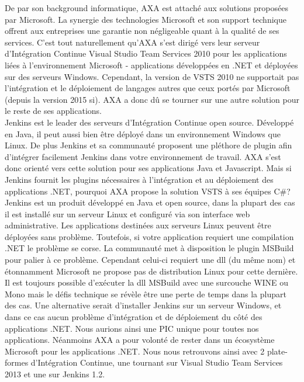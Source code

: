     De par son background informatique, AXA est attaché aux solutions proposées par Microsoft. La synergie des technologies Microsoft et son support technique offrent aux entreprises une garantie non négligeable quant à la qualité de ses services. C'est tout naturellement qu'AXA s'est dirigé vers leur serveur d'Intégration Continue Visual Studio Team Services 2010 pour les applications liées à l'environnement Microsoft - applications développées en .NET et déployées sur des serveurs Windows. Cependant, la version de VSTS 2010 ne supportait pas l'intégration et le déploiement de langages autres que ceux portés par Microsoft (depuis la version 2015 si). AXA a donc dû se tourner sur une autre solution pour le reste de ses applications.\\

    Jenkins est le leader des serveurs d'Intégration Continue open source. Développé en Java, il peut aussi bien être déployé dans un environnement Windows que Linux. De plus Jenkins et sa communauté proposent une pléthore de plugin afin d'intégrer facilement Jenkins dans votre environnement de travail. AXA s'est donc orienté vers cette solution pour ses applications Java et Javascript. Mais si Jenkins fournit les plugins nécessaires à l'intégration et au déploiement des applications .NET, pourquoi AXA propose la solution VSTS à ses équipes C\#?\\

    Jenkins est un produit développé en Java et open source, dans la plupart des cas il est installé sur un serveur Linux et configuré via son interface web administrative. Les applications destinées aux serveurs Linux peuvent être déployées sans problème. Toutefois, si votre application requiert une compilation .NET le problème se corse. La communauté met à disposition le plugin MSBuild pour palier à ce problème. Cependant celui-ci requiert une dll (du même nom) et étonnamment Microsoft ne propose pas de distribution Linux pour cette dernière. Il est toujours possible d'exécuter la dll MSBuild avec une surcouche WINE ou Mono mais le défis technique se révèle être une perte de temps dans la plupart des cas.
    Une alternative serait d'installer Jenkins sur un serveur Windows, et dans ce cas aucun problème d'intégration et de déploiement du côté des applications .NET. Nous aurions ainsi une PIC unique pour toutes nos applications. Néanmoins AXA a pour volonté de rester dans un écosystème Microsoft pour les applications .NET. Nous nous retrouvons ainsi avec 2 plate-formes d'Intégration Continue, une tournant sur Visual Studio Team Services 2013 et une sur Jenkins 1.2.\\

